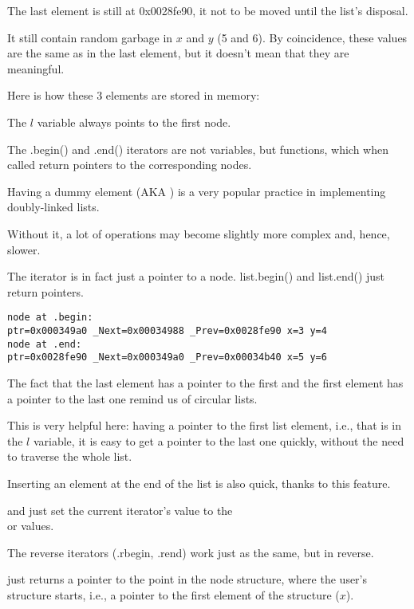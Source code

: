 The last element is still at 0x0028fe90,
it not to be moved until the list's disposal.

It still contain random garbage in $x$ and $y$ (5 and 6). 
By coincidence, these values are the same as in the last element, but it doesn't mean that they are meaningful.

Here is how these 3 elements are stored in memory:



The $l$ variable always points to the first node.

The .begin() and .end() iterators are not variables, but functions, 
which when called return pointers to the corresponding nodes.

Having a dummy element (\ac{AKA} ) is a very popular practice in implementing doubly-linked lists.

Without it, a lot of operations may become slightly more complex and, hence, slower.

The iterator is in fact just a pointer to a node.
list.begin() and list.end() just return pointers.

\begin{lstlisting}
node at .begin:
ptr=0x000349a0 _Next=0x00034988 _Prev=0x0028fe90 x=3 y=4
node at .end:
ptr=0x0028fe90 _Next=0x000349a0 _Prev=0x00034b40 x=5 y=6
\end{lstlisting}

The fact that the last element has a pointer to the first and the first element has a pointer 
to the last one remind us of circular lists.

This is very helpful here: having a pointer to the first list element,
i.e., that is in the $l$ variable,
it is easy to get a pointer to the last one quickly, without the need to traverse the whole list.

Inserting an element at the end of the list is also quick, thanks to this feature.

 and  just set the current iterator's value to the \\
 or  values.

The reverse iterators (.rbegin, .rend) work just as the same, but in reverse.

 just returns a pointer to the point 
in the node structure, where the user's structure starts, i.e., a pointer to the 
first element of the structure ($x$).

